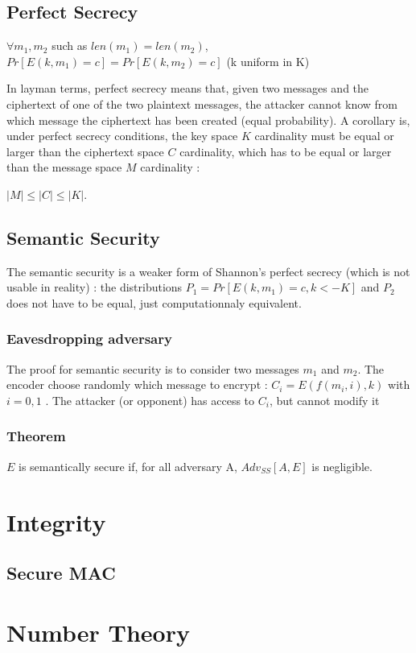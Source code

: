 \subsection{Perfect Secrecy}

\begin{mytheorem}
    $\forall m_1,m_2$ such as $len(m_1) = len(m_2)$, 
    $Pr[E(k,m_1) = c] = Pr[E(k,m_2) = c]$  \flushright (k uniform in K)
\end{mytheorem}

In layman terms, perfect secrecy means that, given two messages and the ciphertext of one of the two plaintext messages, the attacker cannot know from which message the ciphertext has been created (equal probability). A corollary is, under perfect secrecy conditions, the key space $K$ cardinality must be equal or larger than the ciphertext space $C$ cardinality, which has to be equal or larger than the message space $M$ cardinality :
\begin{mytheorem}
    $ |M| \leq |C| \leq |K| $. 
\end{mytheorem}


\subsection{Semantic Security}

The semantic security is a weaker form of Shannon's perfect secrecy (which is not usable in reality) : the distributions $P_1 = Pr[E(k,m_1) = c , k<- K]$ and $P_2$ does not have to be equal, just computationnaly equivalent.

\subsubsection{Eavesdropping adversary}
    The proof for semantic security is to consider two messages $m_1$ and $m_2$. The encoder choose randomly which message to encrypt : $C_i = E( f(m_i,i), k)$ with $i = {0,1}$ .
The attacker (or opponent) has access to $C_i$, but cannot modify it 

\subsubsection{Theorem}

\begin{mytheorem}
    $E$ is semantically secure if, for all adversary A, $Adv_{SS}[A,E]$ is negligible.
\end{mytheorem}


\section{Integrity}
\subsection{Secure MAC}


\section{Number Theory}
